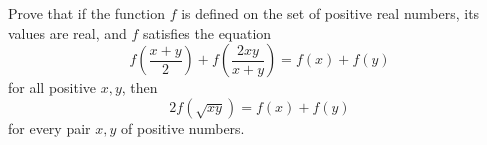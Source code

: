 Prove that if the function $f$ is defined on the set of positive real numbers, its values are real, and $f$ satisfies the equation
$$f\left( \frac{x+y}{2}\right) + f\left(\frac{2xy}{x+y} \right) =f(x)+f(y)$$for all positive $x,y$, then
$$2f(\sqrt{xy})=f(x)+f(y)$$for every pair $x,y$ of positive numbers.